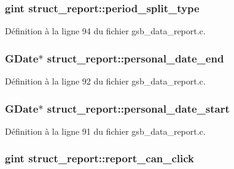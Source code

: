 \subsubsection[{period\_\-split\_\-type}]{\setlength{\rightskip}{0pt plus 5cm}gint {\bf struct\_\-report::period\_\-split\_\-type}}\label{structstruct__report_a2eeddc5fc0da9ff279ea09e43fde8d34}


Définition à la ligne 94 du fichier gsb\_\-data\_\-report.c.

\subsubsection[{personal\_\-date\_\-end}]{\setlength{\rightskip}{0pt plus 5cm}GDate$\ast$ {\bf struct\_\-report::personal\_\-date\_\-end}}\label{structstruct__report_a8c1029792b7144409ca3abf0963e8fc6}


Définition à la ligne 92 du fichier gsb\_\-data\_\-report.c.

\subsubsection[{personal\_\-date\_\-start}]{\setlength{\rightskip}{0pt plus 5cm}GDate$\ast$ {\bf struct\_\-report::personal\_\-date\_\-start}}\label{structstruct__report_a3f90946ae55b908a84aa548a7b9a8531}


Définition à la ligne 91 du fichier gsb\_\-data\_\-report.c.

\subsubsection[{report\_\-can\_\-click}]{\setlength{\rightskip}{0pt plus 5cm}gint {\bf struct\_\-report::report\_\-can\_\-click}}\label{structstruct__report_ad2771435ec5d8d5efd27fb2b2ecc8e5f}


